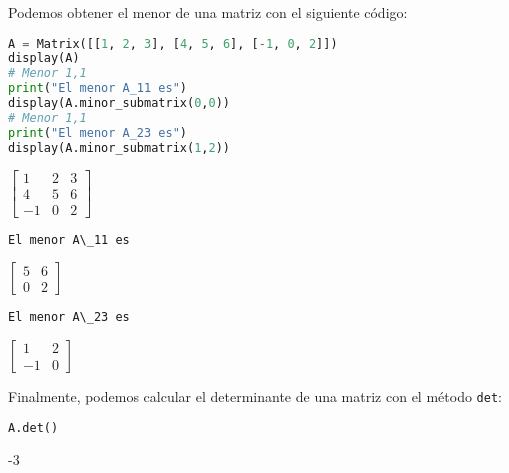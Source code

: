 \documentclass[a4,11pt]{aleph-notas}
\begin{document}
Podemos obtener el menor de una matriz con el siguiente código:
\begin{pycodigo}
    \begin{ipynbcodigo}\begin{lstlisting}[language=Python]
A = Matrix([[1, 2, 3], [4, 5, 6], [-1, 0, 2]])
display(A)
# Menor 1,1
print("El menor A_11 es")
display(A.minor_submatrix(0,0))
# Menor 1,1
print("El menor A_23 es")
display(A.minor_submatrix(1,2))
    \end{lstlisting}\end{ipynbcodigo}
    \begin{ipynbsalida}[2mm]
$\displaystyle \left[\begin{matrix}1 & 2 & 3\\4 & 5 & 6\\-1 & 0 & 2\end{matrix}\right]$

    
    \begin{Verbatim}[commandchars=\\\{\}]
El menor A\_11 es
    \end{Verbatim}

    $\displaystyle \left[\begin{matrix}5 & 6\\0 & 2\end{matrix}\right]$

    
    \begin{Verbatim}[commandchars=\\\{\}]
El menor A\_23 es
    \end{Verbatim}

    $\displaystyle \left[\begin{matrix}1 & 2\\-1 & 0\end{matrix}\right]$
    \end{ipynbsalida}
\end{pycodigo}

Finalmente, podemos calcular el determinante de una matriz con el método
\texttt{det}:
\begin{pycodigo}
    \begin{ipynbcodigo}\begin{lstlisting}[language=Python]
A.det()
    \end{lstlisting}\end{ipynbcodigo}
    \begin{ipynbsalida}
-3
    \end{ipynbsalida}
\end{pycodigo}
\end{document}
